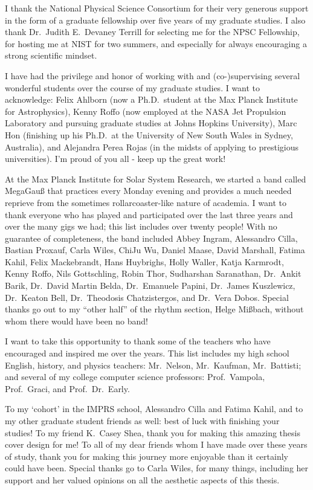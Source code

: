 I thank the National Physical Science Consortium for their very generous support in the form of a graduate fellowship over five years of my graduate studies. 
I also thank Dr.\ Judith E.\ Devaney Terrill for selecting me for the NPSC Fellowship, for hosting me at NIST for two summers, and especially for always encouraging a strong scientific mindset. 

I have had the privilege and honor of working with and (co-)supervising several wonderful students over the course of my graduate studies. 
I want to acknowledge: Felix Ahlborn (now a Ph.D.\ student at the Max Planck Institute for Astrophysics), Kenny Roffo (now employed at the NASA Jet Propulsion Laboratory and pursuing graduate studies at Johns Hopkins University), Marc Hon (finishing up his Ph.D.\ at the University of New South Wales in Sydney, Australia), and Alejandra Perea Rojas (in the midsts of applying to prestigious universities). 
I'm proud of you all - keep up the great work! 

At the Max Planck Institute for Solar System Research, we started a band called MegaGau{\ss} that practices every Monday evening and provides a much needed reprieve from the sometimes rollarcoaster-like nature of academia. 
I want to thank everyone who has played and participated over the last three years and over the many gigs we had; this list includes over twenty people! 
With no guarantee of completeness, the band included 
Abbey Ingram, %
Alessandro Cilla, %
Bastian Proxauf, %
Carla Wiles, %
ChiJu Wu, %
Daniel Maase,
David Marshall, %
Fatima Kahil, %
Felix Mackebrandt, %
Hans Huybrighs, %
Holly Waller, %
Katja Karmrodt, %
Kenny Roffo, %
Nils Gottschling, %
Robin Thor, %
Sudharshan Saranathan, %
Dr.\ Ankit Barik, %
Dr.\ David Martin Belda, %
Dr.\ Emanuele Papini, %
Dr.\ James Kuszlewicz, %
Dr.\ Keaton Bell, %
Dr.\ Theodosis Chatzistergos, and
Dr.\ Vera Dobos. %
Special thanks go out to my ``other half'' of the rhythm section, Helge Mi{\ss}bach, without whom there would have been no band! 

I want to take this opportunity to thank some of the teachers who have encouraged and inspired me over the years. 
This list includes my high school English, history, and physics teachers: Mr.\ Nelson, Mr.\ Kaufman, Mr.\ Battisti; and several of my college computer science professors: Prof.\ Vampola, Prof.\ Graci, and Prof.\ Dr.\ Early. 

To my `cohort' in the IMPRS school, Alessandro Cilla and Fatima Kahil, and to my other graduate student friends as well: best of luck with finishing your studies! 
To my friend K.\ Casey Shea, thank you for making this amazing thesis cover design for me! 
To all of my dear friends whom I have made over these years of study, thank you for making this journey more enjoyable than it certainly could have been. 
%
%
%
%
%
%
%
Special thanks go to Carla Wiles, for many things, including her support and her valued opinions on all the aesthetic aspects of this thesis. 


